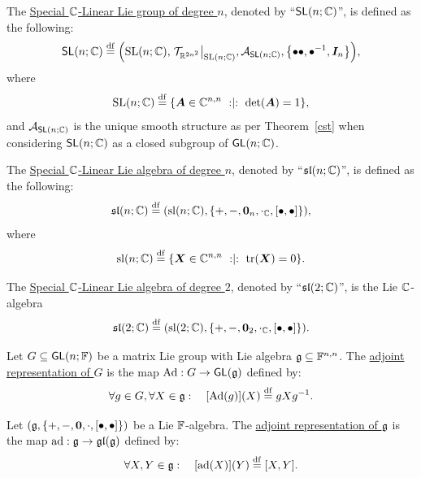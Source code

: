 \documentclass[11pt,reqno]{amsart}
\begin{document}
\begin{Def}
The \ul{Special $\mathbb{C}$-Linear Lie group of degree $n$},
denoted by ``$\operatorname{\mathsf{SL}}(n;\mathbb{C})$'', is defined as the following:
\[
\SL(n;\C)\df\Br{\SLset(n;\C),\eval{\T_{\R^{2n^2}}}_{\SLset(n;\C)},
\A_{\SL(n;\C)},\set{\bullet\bullet,\bullet\inv,\bm I_n}},
\]
where
\[
\SLset(n;\C)\df\set{\bm A\in\C^{n,n}\st\det\Br{\bm A}=1},
\]
and $\mathcal{A}_{\operatorname{\mathsf{SL}}(n;\mathbb{C})}$ is the unique smooth structure as per Theorem~\ref{cst}
when considering $\operatorname{\mathsf{SL}}(n;\mathbb{C})$ as a closed subgroup of $\operatorname{\mathsf{GL}}(n;\mathbb{C})$.
\end{Def}

\begin{Def}
The \ul{Special $\mathbb{C}$-Linear Lie algebra of degree $n$},
denoted by ``$\mathfrak{sl}(n;\mathbb{C})$'', is defined as the following:
\[
\sl(n;\C)\df\Br{\slset(n;\C),\set{+,-,\bm0_n,\cdot_\C,\SqBr{\bullet,\bullet}}},
\]
where
\[
\slset(n;\C)\df\set{\bm X\in\C^{n,n}\st\tr\Br{\bm X}=0}.
\]
\end{Def}

\begin{Def}
The \ul{Special $\mathbb{C}$-Linear Lie algebra of degree $2$},
denoted by ``$\mathfrak{sl}(2;\mathbb{C})$'', is the Lie $\mathbb{C}$-algebra
\[
\sl(2;\C)\df\Br{\slset(2;\C),\set{+,-,\bm0_2,\cdot_\C,\SqBr{\bullet,\bullet}}}.
\]
\end{Def}


\begin{Def}\label{def:adjoint-group}
Let $G\subseteq\operatorname{\mathsf{GL}}(n;\mathbb{F})$ be a matrix Lie group with Lie algebra
$\mathfrak{g}\subseteq\mathbb{F}^{n,n}$.
The \ul{adjoint representation of $G$} is the map
$\operatorname{Ad}:G\to\operatorname{\mathsf{GL}}(\mathfrak{g})$ defined by:
\[
\forall g\in G,\forall X\in\g:\quad
\FUNC{\operatorname{Ad}(g)}{X}\df g X g\inv.
\]
\end{Def}

\begin{Def}\label{def:adjoint-algebra}
Let $\Br{\g,\set{+,-,\bm0,\cdot,\SqBr{\bullet,\bullet}}}$ be a Lie $\mathbb{F}$-algebra.
The \ul{adjoint representation of $\mathfrak{g}$} is the map
$\operatorname{ad}:\mathfrak{g}\to\mathfrak{gl}(\mathfrak{g})$ defined by:
\[
\forall X,Y\in\g:\quad
\FUNC{\operatorname{ad}(X)}{Y}\df\SqBr{X,Y}.
\]
\end{Def}
\end{document}
